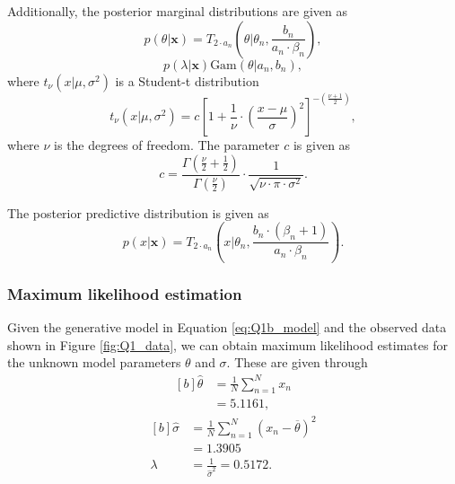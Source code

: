 \documentclass{article}
\begin{document}
Additionally, the posterior marginal distributions are given as
\begin{equation}\label{eq:Q1b_marginal_theta}
p(\theta \vert \mathbf{x}) = T_{2 \cdot a_n} \left( \theta \vert \theta_n, \frac{b_n}{a_n \cdot \beta_n} \right),
\end{equation}
\begin{equation}\label{eq:Q1b_marginal_lambda}
p(\lambda \vert \mathbf{x}) \text{Gam}(\theta \vert a_n, b_n),
\end{equation}
where $t_\nu(x \vert \mu, \sigma^2)$ is a Student-t distribution
\begin{equation}
t_\nu(x \vert \mu, \sigma^2) = c \left[ 1 + \frac{1}{\nu} \cdot \left(\frac{x - \mu}{\sigma} \right)^2 \right]^{-\left( \frac{\nu + 1}{2} \right)},
\end{equation}
where $\nu$ is the degrees of freedom. The parameter $c$ is given as
\begin{equation}
c = \frac{\Gamma \left(\frac{\nu}{2} + \frac{1}{2}\right)}{\Gamma \left(\frac{\nu}{2}\right)} \cdot \frac{1}{\sqrt{\nu \cdot \pi \cdot \sigma^2}}.
\end{equation}

The posterior predictive distribution is given as
\begin{equation}\label{eq:Q1b_posterior_predict}
p(x \vert \mathbf{x}) = T_{2 \cdot a_n} \left(x \vert \theta_n, \frac{b_n \cdot \left( \beta_n + 1 \right)}{a_n \cdot \beta_n}  \right).
\end{equation}

\subsubsection{Maximum likelihood estimation}
Given the generative model in Equation \eqref{eq:Q1b_model} and the observed data shown in Figure \ref{fig:Q1_data}, we can obtain maximum likelihood estimates for the unknown model parameters $\theta$ and $\sigma$. 
These are given through
\begin{equation}
\begin{aligned}[b]
\hat{\theta} &= \frac{1}{N} \sum_{n=1}^{N} x_n \\
&= 5.1161,
\end{aligned}
\end{equation}
\begin{equation}
\begin{aligned}[b]
\hat{\sigma} &= \frac{1}{N} \sum_{n=1}^{N} (x_n - \overline{\theta})^2 \\
&= 1.3905 \\
\lambda &= \frac{1}{\hat{\sigma}^2} = 0.5172.
\end{aligned}
\end{equation}
\end{document}
